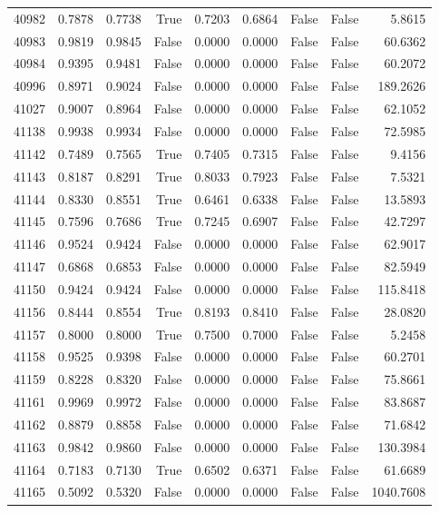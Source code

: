 \begin{longtable}{rrrrrrrrr}
40982 & 0.7878 & 0.7738 & True & 0.7203 & 0.6864 & False & False & 5.8615 \\
40983 & 0.9819 & 0.9845 & False & 0.0000 & 0.0000 & False & False & 60.6362 \\
40984 & 0.9395 & 0.9481 & False & 0.0000 & 0.0000 & False & False & 60.2072 \\
40996 & 0.8971 & 0.9024 & False & 0.0000 & 0.0000 & False & False & 189.2626 \\
41027 & 0.9007 & 0.8964 & False & 0.0000 & 0.0000 & False & False & 62.1052 \\
41138 & 0.9938 & 0.9934 & False & 0.0000 & 0.0000 & False & False & 72.5985 \\
41142 & 0.7489 & 0.7565 & True & 0.7405 & 0.7315 & False & False & 9.4156 \\
41143 & 0.8187 & 0.8291 & True & 0.8033 & 0.7923 & False & False & 7.5321 \\
41144 & 0.8330 & 0.8551 & True & 0.6461 & 0.6338 & False & False & 13.5893 \\
41145 & 0.7596 & 0.7686 & True & 0.7245 & 0.6907 & False & False & 42.7297 \\
41146 & 0.9524 & 0.9424 & False & 0.0000 & 0.0000 & False & False & 62.9017 \\
41147 & 0.6868 & 0.6853 & False & 0.0000 & 0.0000 & False & False & 82.5949 \\
41150 & 0.9424 & 0.9424 & False & 0.0000 & 0.0000 & False & False & 115.8418 \\
41156 & 0.8444 & 0.8554 & True & 0.8193 & 0.8410 & False & False & 28.0820 \\
41157 & 0.8000 & 0.8000 & True & 0.7500 & 0.7000 & False & False & 5.2458 \\
41158 & 0.9525 & 0.9398 & False & 0.0000 & 0.0000 & False & False & 60.2701 \\
41159 & 0.8228 & 0.8320 & False & 0.0000 & 0.0000 & False & False & 75.8661 \\
41161 & 0.9969 & 0.9972 & False & 0.0000 & 0.0000 & False & False & 83.8687 \\
41162 & 0.8879 & 0.8858 & False & 0.0000 & 0.0000 & False & False & 71.6842 \\
41163 & 0.9842 & 0.9860 & False & 0.0000 & 0.0000 & False & False & 130.3984 \\
41164 & 0.7183 & 0.7130 & True & 0.6502 & 0.6371 & False & False & 61.6689 \\
41165 & 0.5092 & 0.5320 & False & 0.0000 & 0.0000 & False & False & 1040.7608 \\

\end{longtable}
